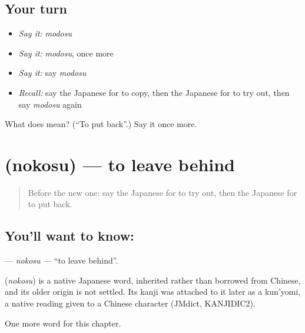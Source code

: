 \subsection*{Your turn}
\begin{itemize}
\raggedright
  \item \emph{Say it:} \emph{modosu}
  \item \emph{Say it:} \emph{modosu}, once more
  \item \emph{Say it:} say \emph{modosu}
  \item \emph{Recall:} say the Japanese for to copy, then the Japanese for to try out, then say \emph{modosu} again
\end{itemize}

\begin{tcolorbox}[breakable,colback=teal!4,colframe=teal!35!black,title={Before you move on}]
What does  mean? (\textquotedblleft{}To put back\textquotedblright{}.) Say it once more.
\end{tcolorbox}
\section[\texorpdfstring{\ja{のこす} (nokosu)}{のこす (nokosu)}]{ (nokosu) — to leave behind}

\label{lesson:JA-C88-nokosu}



\begin{quote}
Before the new one: say the Japanese for to try out, then the Japanese for to put back.
\end{quote}

\subsection*{You'll want to know: }
\textbf{} — \emph{nokosu} — \textquotedblleft{}to leave behind\textquotedblright{}.

\begin{cousinweb}
\textbf{} (\emph{nokosu}) is a native Japanese word, inherited rather than borrowed from Chinese, and its older origin is not settled. Its kanji was attached to it later as a kun'yomi, a native reading given to a Chinese character (JMdict, KANJIDIC2).
\end{cousinweb}

\begin{grammarlens}[title={What you've built}]
One more word for this chapter.
\end{grammarlens}

